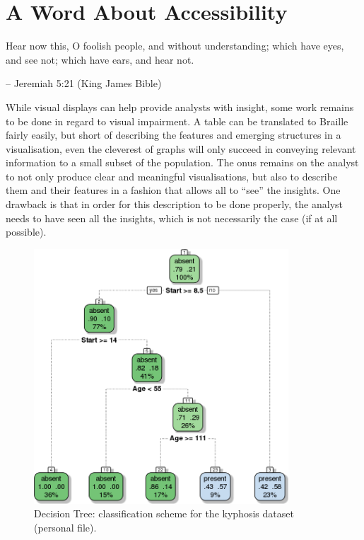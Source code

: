 \section{A Word About Accessibility}
\begin{tcolorbox}[title=Cubism's Missing Link]
Hear now this, O foolish people, and without understanding; which have eyes, and see not; which have ears, and hear not.\\[-0.6cm]
\begin{flushright}
-- Jeremiah 5:21 (King James Bible)
\end{flushright}
\end{tcolorbox}\noindent
While visual displays can help provide analysts with insight, some work remains to be done in regard to visual impairment. A table can be translated to Braille fairly easily, but short of describing the features and emerging structures in a visualisation, even the cleverest of graphs will only succeed in conveying relevant information to a small subset of the population. The onus remains on the analyst to not only produce clear and meaningful visualisations, but also to describe them and their features in a fashion that allows all to ``see'' the insights. One drawback is that in order for this description to be done properly, the analyst needs to have seen all the insights, which is not necessarily the case (if at all possible).
\newl\vfill
\begin{figure}[t]
\centering
\includegraphics[width=0.85\textwidth]{Images/class_kyphosis_tree2.png}
\caption[\small Decision Tree: classification scheme for the kyphosis dataset ]{\small Decision Tree: classification scheme for the kyphosis dataset (personal file).} \label{fig:ex_dt_kyp}
\end{figure}
